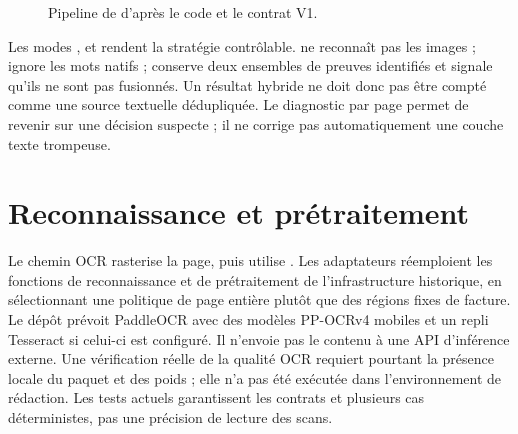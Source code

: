 \begin{figure}[H]\centering
{}
\caption{Pipeline de \texttt{} d'après le code et le contrat V1.}\label{fig:di-pipeline}
\end{figure}

Les modes \texttt{}, \texttt{} et \texttt{} rendent la stratégie contrôlable. \texttt{} ne reconnaît pas les images ; \texttt{} ignore les mots natifs ; \texttt{} conserve deux ensembles de preuves identifiés et signale qu'ils ne sont pas fusionnés. Un résultat hybride ne doit donc pas être compté comme une source textuelle dédupliquée. Le diagnostic par page permet de revenir sur une décision \texttt{} suspecte ; il ne corrige pas automatiquement une couche texte trompeuse.

\section{Reconnaissance et prétraitement}
Le chemin OCR rasterise la page, puis utilise \texttt{}. Les adaptateurs réemploient les fonctions de reconnaissance et de prétraitement de l'infrastructure historique, en sélectionnant une politique de page entière plutôt que des régions fixes de facture. Le dépôt prévoit PaddleOCR avec des modèles PP-OCRv4 mobiles et un repli Tesseract si celui-ci est configuré. Il n'envoie pas le contenu à une API d'inférence externe. Une vérification réelle de la qualité OCR requiert pourtant la présence locale du paquet et des poids ; elle n'a pas été exécutée dans l'environnement de rédaction. Les tests actuels garantissent les contrats et plusieurs cas déterministes, pas une précision de lecture des scans.

